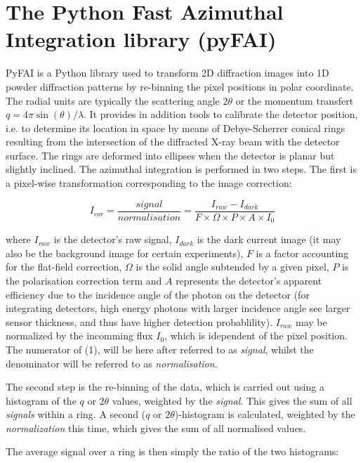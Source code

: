 \documentclass[preprint, pdf]{iucr}              %
\begin{document}
\section{The Python Fast Azimuthal Integration library (pyFAI)}

PyFAI is a Python \cite{python} library used to transform 2D diffraction images into
1D powder diffraction patterns by re-binning the pixel positions in polar
coordinate. 
The radial units are typically the scattering angle  
$2\theta$ or the momentum transfert $q=4\pi \sin(\theta)/\lambda$.
It provides in addition tools to calibrate the detector position, i.e.
to determine its location in space by means of Debye-Scherrer conical rings
resulting from the intersection of the diffracted X-ray beam with the
detector surface. 
The rings are deformed into ellipses when the detector is planar but 
slightly inclined. 
The azimuthal integration is performed in two steps. 
The first is a pixel-wise
transformation corresponding to the image correction:

\begin{equation}
I_{cor} = \frac{signal}{normalisation}  = \frac{I_{raw} - I_{dark}}{F \times
\Omega \times P \times A \times I_0} 
\end{equation}

where $I_{raw}$ is the detector's raw signal, $I_{dark}$ is the dark current
image (it may also be the background image for certain experiments), $F$ is a 
factor accounting for the flat-field correction, $\Omega$ is the solid
angle subtended by a given pixel, $P$ is the polarisation correction term and
$A$ represents the detector's apparent efficiency due to the incidence angle of the
photon on the detector (for integrating detectors, high energy photons with
larger incidence angle see larger sensor thickness, and thus have higher
detection probablility).
$I_{raw}$ may be normalized by the incomming flux $I_0$, which is
idependent of the pixel position.
The numerator of (1), will be here after referred to as
\textit{signal}, whilst the denominator will be referred to as
\textit{normalisation}.

The second step is the re-binning of the data, which is carried out 
using a histogram of the $q$ or $2\theta$ values, weighted by the
\textit{signal}.
This gives the sum of all \textit{signals} within a ring.
A second ($q$ or $2\theta$)-histogram is calculated, weighted
by the \textit{normalization} this time, which gives the sum of all
normalised values.

The average signal over a ring is then simply the ratio of the two histograms:
\end{document}

